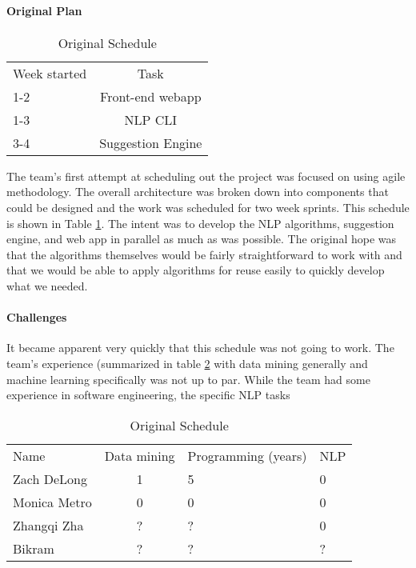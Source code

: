 
\paragraph{Original Plan}
\begin{table}[h]
  \caption{Original Schedule}
\begin{tabular}{ l c }
  Week started & Task \\
  1-2 & Front-end webapp  \\
  1-3 & NLP CLI  \\
  3-4 & Suggestion Engine 
\end{tabular} \label{sec:devi-from-init-pln:original-timeline}
\end{table}

The team's first attempt at scheduling out the project was focused on
using agile methodology.  
The overall architecture was broken down into components that could be
designed and the work was scheduled for two week sprints.
This schedule is shown in Table
\ref{sec:devi-from-init-pln:original-timeline}.
The intent was to develop the NLP algorithms, suggestion engine, and
web app in parallel as much as was possible.
The original hope was that the algorithms themselves would be fairly
straightforward to work with and that we would be able to apply
algorithms for reuse easily to quickly develop what we needed.

\paragraph{Challenges}
It became apparent very quickly that this schedule was not going to
work.
The team's experience (summarized in table
\ref{sec:devi-from-init-pln:skillsets} with data mining generally and
machine learning specifically was not up to par.
While the team had some experience in software engineering, the
specific NLP tasks 

\begin{table}[h]
  \caption{Original Schedule}
\begin{tabular}{ l c l l}
  Name & Data mining & Programming (years) & NLP\\
  Zach DeLong & 1 & 5 & 0 \\
  Monica Metro &  0 & 0 & 0 \\
  Zhangqi Zha & ? & ? & 0\\
  Bikram & ? & ? & ?  
\end{tabular} \label{sec:devi-from-init-pln:skillsets}
\end{table}

